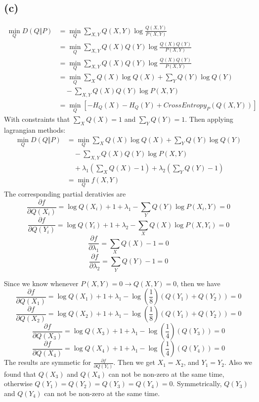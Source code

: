 \documentclass{article}
\begin{document}
\subsection*{(c)}
\begin{equation}
    \begin{split}
        \min_{Q} D(Q\Vert P) &= \min_{Q}\sum_{X, Y} Q(X, Y) \log\frac{Q(X, Y)}{P(X, Y)}\\
                    &= \min_{Q}\sum_{X, Y} {Q(X)Q(Y)} \log\frac{Q(X)Q(Y)}{P(X, Y)}\\
                    &= \min_{Q}\sum_{X, Y} {Q(X)Q(Y)} \log\frac{Q(X)Q(Y)}{P(X, Y)}\\
                    &= \min_{Q}\sum_{X} {Q(X)\log Q(X)} + \sum_{Y} {Q(Y)\log Q(Y)}\\
                    &\quad  - \sum_{X, Y} {Q(X)Q(Y)} \log{P(X, Y)}\\
                    &= \min_{Q} [-H_Q(X) - H_Q(Y) + CrossEntropy_P(Q(X,Y))]
    \end{split}
\end{equation}
With constraints that $\sum_X{Q(X)}=1$ and $\sum_Y{Q(Y)}=1$.
Then applying lagrangian methods:
\begin{equation}
    \begin{split}
        \min_{Q} D(Q\Vert P)
                    &= \min_{Q}\sum_{X} {Q(X)\log Q(X)} + \sum_{Y} {Q(Y)\log Q(Y)}\\
                    &\quad - \sum_{X, Y} {Q(X)Q(Y)} \log{P(X, Y)} \\
                    &\quad + \lambda_1 (\sum_X{Q(X)} - 1) + \lambda_2 (\sum_Y{Q(Y)} - 1)\\
                    &= \min_Q f(X, Y)
    \end{split}
\end{equation}
The corresponding partial derativies are 
$$\frac{\partial{f}}{\partial{Q(X_i)}} = \log Q(X_i) + 1 + \lambda_1 - \sum_Y Q(Y)\log P(X_i, Y) = 0$$
$$\frac{\partial{f}}{\partial{Q(Y_i)}} = \log Q(Y_i) + 1 + \lambda_2 - \sum_X Q(X)\log P(X, Y_i) = 0$$
$$\frac{\partial{f}}{\partial\lambda_1} = \sum_X{Q(X)}-1 = 0$$ 
$$\frac{\partial{f}}{\partial\lambda_2} = \sum_Y{Q(Y)}-1 = 0$$

\noindent Since we know whenever $P(X, Y) = 0 \rightarrow Q(X, Y) = 0$, then we have
$$\frac{\partial{f}}{\partial{Q(X_1)}} = \log Q(X_1) + 1 + \lambda_1 -  \log(\frac{1}{8})( Q(Y_1) +  Q(Y_2))= 0$$
$$\frac{\partial{f}}{\partial{Q(X_2)}} = \log Q(X_2) + 1 + \lambda_1 -  \log(\frac{1}{8})( Q(Y_1) +  Q(Y_2))= 0$$
$$\frac{\partial{f}}{\partial{Q(X_3)}} = \log Q(X_3) + 1 + \lambda_1 -  \log(\frac{1}{4})( Q(Y_3))= 0$$
$$\frac{\partial{f}}{\partial{Q(X_4)}} = \log Q(X_4) + 1 + \lambda_1 -  \log(\frac{1}{4})( Q(Y_4))= 0$$
The results are symmetic for $\frac{\partial{f}}{\partial{Q(Y_i)}}$. Then we get $X_1 = X_2$, and $Y_1 = Y_2$. 
Also we found that $Q(X_3)$ and $Q(X_4)$ can not be non-zero at the same time, otherwise $Q(Y_1) = Q(Y_2) = Q(Y_3) = Q(Y_4) = 0$. 
Symmetrically, $Q(Y_3)$ and $Q(Y_4)$ can not be non-zero at the same time.
\end{document}
